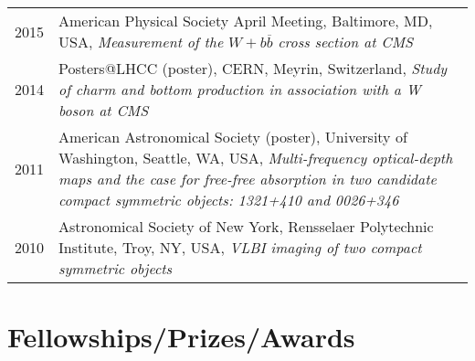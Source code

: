 \documentclass[10pt]{article} %
\begin{document}
\begin{tabulary}{0.9\textwidth}{RL}
2015 & American Physical Society April Meeting, Baltimore, MD, USA, 
 \emph{Measurement of the $W+b\overline{b}$ cross section at CMS} \\

2014 & Posters@LHCC (poster), CERN, Meyrin, Switzerland,
 \emph{Study of charm and bottom production in association with a W boson at CMS } \\

2011 & American Astronomical Society (poster), University of Washington, Seattle, WA, USA,
 \emph{Multi-frequency optical-depth maps and the case for free-free absorption 
 in two candidate compact symmetric objects: 1321+410 and 0026+346} \\

2010 & Astronomical Society of New York, Rensselaer Polytechnic Institute, Troy, NY, USA,
 \emph{VLBI imaging of two compact symmetric objects } \\
\end{tabulary}


\section{Fellowships/Prizes/Awards}
\end{document}
